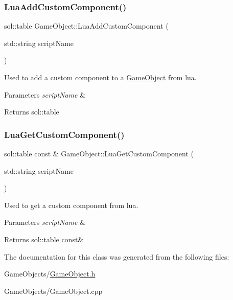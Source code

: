 \subsubsection{\texorpdfstring{Lua\+Add\+Custom\+Component()}{LuaAddCustomComponent()}}
{\footnotesize\ttfamily sol\+::table Game\+Object\+::\+Lua\+Add\+Custom\+Component (\begin{DoxyParamCaption}\item[{std\+::string}]{script\+Name }\end{DoxyParamCaption})}



Used to add a custom component to a \hyperlink{classGameObject}{Game\+Object} from lua. 


\begin{DoxyParams}{Parameters}
{\em script\+Name} & \\
\hline
\end{DoxyParams}
\begin{DoxyReturn}{Returns}
sol\+::table 
\end{DoxyReturn}
\mbox{\label{classGameObject_a7838788ee6710528dbcb58e1c6400079}} 
\subsubsection{\texorpdfstring{Lua\+Get\+Custom\+Component()}{LuaGetCustomComponent()}}
{\footnotesize\ttfamily sol\+::table const  \& Game\+Object\+::\+Lua\+Get\+Custom\+Component (\begin{DoxyParamCaption}\item[{std\+::string}]{script\+Name }\end{DoxyParamCaption})}



Used to get a custom component from lua. 


\begin{DoxyParams}{Parameters}
{\em script\+Name} & \\
\hline
\end{DoxyParams}
\begin{DoxyReturn}{Returns}
sol\+::table const\& 
\end{DoxyReturn}


The documentation for this class was generated from the following files\+:\begin{DoxyCompactItemize}
\item 
Game\+Objects/\hyperlink{GameObject_8h}{Game\+Object.\+h}\item 
Game\+Objects/Game\+Object.\+cpp\end{DoxyCompactItemize}
